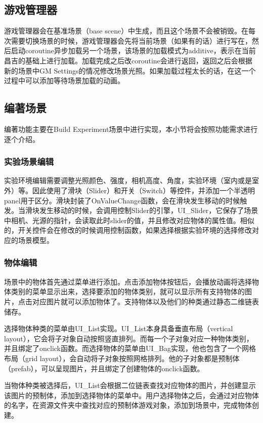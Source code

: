 \subsection{游戏管理器}
游戏管理器会在基准场景（base scene）中生成，而且这个场景不会被销毁。在每次需要切换场景的时候，游戏管理器会先将当前场景（如果有的话）进行写在，然后启动coroutine异步加载另一个场景，该场景的加载模式为additive，表示在当前昌吉的基础上进行加载。加载完成之后改coroutine会进行返回，返回之后会根据新的场景中GM Settings的情况修改场景光照。如果加载过程太长的话，在这一个过程中可以添加等待场景加载的动画。

\subsection{编著场景}
编著功能主要在Build Experiment场景中进行实现，本小节将会按照功能需求进行逐个介绍。

\subsubsection{实验场景编辑}
实验环境编辑需要调整光照颜色、强度，相机高度、角度，实验环境（室内或是室外）等。因此使用了滑块（Slider）和开关（Switch）等控件，并添加一个半透明panel用于区分。滑块封装了OnValueChange函数，会在滑块发生移动的时候触发。当滑块发生移动的时候，会调用控制Slider的引擎，UI\_Slider，它保存了场景中相机、光源的指针，会读取此时slider的值，并且修改对应物体的属性值。相似的，开关控件会在修改的时候调用控制函数，如果选择根据实验环境的选择修改对应的场景模型。

\subsubsection{物体编辑}
场景中的物体首先通过菜单进行添加。点击添加物体按钮后，会播放动画将选择物体类别的菜单显示出来，选择要添加的物体类别，就可以显示所有支持物体的图片，点击对应图片就可以添加物体了。支持物体以及他们的种类通过静态二维链表储存。

选择物体种类的菜单由UI\_List实现。UI\_List本身具备垂直布局（vertical layout），它会将子对象自动按照竖直排列。而每一个子对象对应一种物体类别，并且绑定了onclick函数。而选择物体的菜单由UI\_Bag实现，他也包含了一个网格布局（grid layout），会自动将子对象按照网格排列。他的子对象都是预制体（prefab），可以呈现图片，并且绑定了创建物体的onclick函数。

当物体种类被选择后，UI\_List会根据二位链表查找对应物体的图片，并创建显示该图片的预制体，添加到选择物体的菜单中。用户选择物体之后，会通过对应物体的名字，在资源文件夹中查找对应的预制体游戏对象，添加到场景中，完成物体创建。

